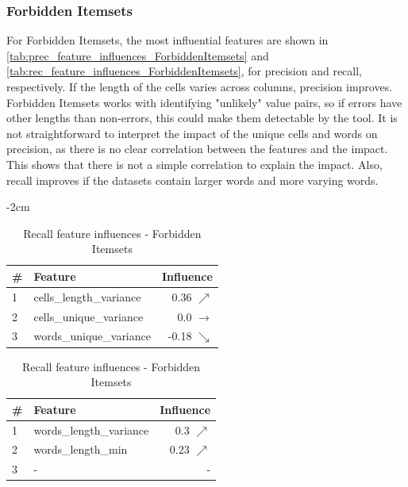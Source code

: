 

\subsubsection{Forbidden Itemsets}
For Forbidden Itemsets, the most influential features are shown in \autoref{tab:prec_feature_influences_ForbiddenItemsets} and \autoref{tab:rec_feature_influences_ForbiddenItemsets}, for precision and recall, respectively. If the length of the cells varies across columns, precision improves. Forbidden Itemsets works with identifying "unlikely" value pairs, so if errors have other lengths than non-errors, this could make them detectable by the tool. It is not straightforward to interpret the impact of the unique cells and words on precision, as there is no clear correlation between the features and the impact. This shows that there is not a simple correlation to explain the impact.
Also, recall improves if the datasets contain larger words and more varying words.

\begin{table}[H]
	\centering
	\addtolength{\leftskip} {-2cm}
	\addtolength{\rightskip}{-2cm}
	\captionsetup[subtable]{position = below}
	\captionsetup[table]{position=top}
	\caption{Top feature influences - Forbidden Itemsets}
	\label{tab:feature_influences_ForbiddenItemsets}
		\begin{subtable}{0.5\linewidth}
		\centering
\begin{tabular}{llr}
\toprule
 \# &                  Feature &          Influence \\
\midrule
 1 &  cells\_length\_variance &    0.36 $\nearrow$ \\
 2 &  cells\_unique\_variance &  0.0 $\rightarrow$ \\
 3 &  words\_unique\_variance &   -0.18 $\searrow$ \\
\bottomrule
\end{tabular}
		\caption{Precision feature influences - Forbidden Itemsets}
		\label{tab:prec_feature_influences_ForbiddenItemsets}
	\end{subtable}
	\hspace*{4em}
	\begin{subtable}{0.5\linewidth}
		\centering
\begin{tabular}{llr}
\toprule
 \# &                  Feature &        Influence \\
\midrule
 1 &  words\_length\_variance &   0.3 $\nearrow$ \\
 2 &       words\_length\_min &  0.23 $\nearrow$ \\
 3 &     - &                - \\
\bottomrule
\end{tabular}
		\caption{Recall feature influences - Forbidden Itemsets}
		\label{tab:rec_feature_influences_ForbiddenItemsets}
	\end{subtable}%
\end{table}

